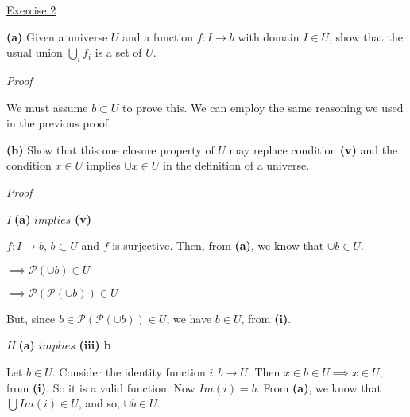 \noindent
\underline{Exercise 2}
\vspace{2mm}

\textbf{(a)} Given a universe $U$ and a function $f: I \to b$ with domain $I \in
U$, show that the usual union $\bigcup_i f_i$ is a set of $U$.

\vspace{2mm}

\noindent
\emph{Proof}

We must assume $b \subset U$ to prove this. We can employ the same reasoning we
used in the previous proof.

\vspace{2mm}

\textbf{(b)} Show that this one closure property of $U$ may replace condition
\textbf{(v)} and the condition $x \in U$ implies $\cup x \in U$ in the
definition of a universe.

\vspace{2mm}

\noindent
\emph{Proof}

\vspace{2mm}
\emph{I} \textbf{(a)} $implies$ \textbf{(v)} 

$f : I \to b$, $b \subset U$ and $f$ is surjective. Then, from \textbf{(a)}, we
know that $\cup b \in U$. 

$\implies \mathcal{P}(\cup b) \in U$

$\implies \mathcal{P}(\mathcal{P}(\cup b)) \in U$

But, since $b \in \mathcal{P}(\mathcal{P}(\cup b)) \in U$, we have $b \in U$,
from \textbf{(i)}.


\vspace{2mm}
\emph{II} \textbf{(a)} $implies$ \textbf{(iii) b}

Let $b \in U$. Consider the identity function $i: b \to U$. 
Then $x \in b \in U \implies x \in U$, from \textbf{(i)}.
So it is a valid function. Now $Im(i) = b$. From \textbf{(a)}, we know that
$\bigcup Im(i) \in U$, and so, $\cup b \in U$.

\vspace{2mm}
